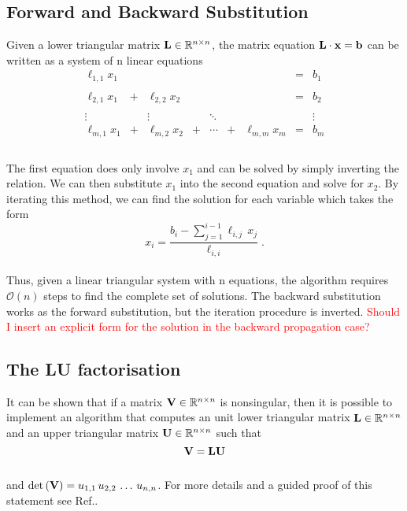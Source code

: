 \documentclass[../main.tex]{subfiles}
\begin{document}
\subsection*{Forward and Backward Substitution}
Given a lower triangular matrix $\mathbf{L} \in \mathbb{R}^{n \times n}$, the matrix equation $\mathbf{L} \cdot \mathbf{x} = \mathbf{b}$ can be written as a system of n linear equations
\\
\begin{equation*}
\begin{matrix}
  \ell_{1,1} x_1 &   &                &   &        &   &                & = &    b_1 \\\\
  \ell_{2,1} x_1 & + & \ell_{2,2} x_2 &   &        &   &                & = &    b_2 \\\\
          \vdots &   &         \vdots &   & \ddots &   &                &   & \vdots \\
  \ell_{m,1} x_1 & + & \ell_{m,2} x_2 & + & \dotsb & + & \ell_{m,m} x_m & = &    b_m \\
\end{matrix}
\end{equation*}
\\
The first equation does only involve $x_1$ and can be solved by simply inverting the relation. We can then substitute $x_1$ into the second equation and solve for $x_2$. By iterating this method, we can find the solution for each variable which takes the form
\\
\begin{equation*}
    x_i = \frac{b_i - \sum_{j=1}^{i-1}\ell_{i,j}\,x_j}{\ell_{i,i}} \;.
\end{equation*}
\\
Thus, given a linear triangular system with n equations, the algorithm requires $\mathcal{O}(n)$ steps to find the complete set of solutions. The backward substitution works as the forward substitution, but the iteration procedure is inverted. \textcolor{red}{Should I insert an explicit form for the solution in the backward propagation case?}

\subsection*{The LU factorisation}
It can be shown that if a matrix $\mathbf{V} \in \mathbb{R}^{n\times n}$ is nonsingular, then it is possible to implement an algorithm that computes an unit lower triangular matrix $\mathbf{L} \in \mathbb{R}^{n\times n}$ and an upper triangular matrix $\mathbf{U} \in  \mathbb{R}^{n\times n}$ such that 
\\
\begin{equation*}
    \mathbf{V} = \mathbf{L} \mathbf{U} 
\end{equation*}
\\
and $\det\left( \mathbf{V} \right) = u_{1,1} \, u_{2,2} \, \dots \, u_{n,n} $. For more details and a guided proof of this statement see Ref.\cite{GoluVanl96}. 
\end{document}
